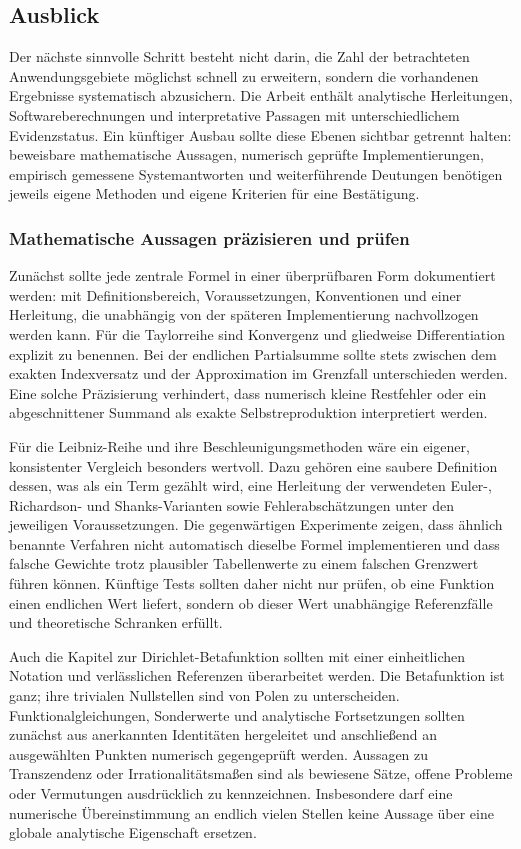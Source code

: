 \documentclass[a4paper,12pt,twoside]{report}
\theoremstyle{definition}
\begin{document}
\subsection{Ausblick}

Der nächste sinnvolle Schritt besteht nicht darin, die Zahl der betrachteten Anwendungsgebiete möglichst schnell zu erweitern, sondern die vorhandenen Ergebnisse systematisch abzusichern. Die Arbeit enthält analytische Herleitungen, Softwareberechnungen und interpretative Passagen mit unterschiedlichem Evidenzstatus. Ein künftiger Ausbau sollte diese Ebenen sichtbar getrennt halten: beweisbare mathematische Aussagen, numerisch geprüfte Implementierungen, empirisch gemessene Systemantworten und weiterführende Deutungen benötigen jeweils eigene Methoden und eigene Kriterien für eine Bestätigung.

\subsubsection{Mathematische Aussagen präzisieren und prüfen}

Zunächst sollte jede zentrale Formel in einer überprüfbaren Form dokumentiert werden: mit Definitionsbereich, Voraussetzungen, Konventionen und einer Herleitung, die unabhängig von der späteren Implementierung nachvollzogen werden kann. Für die Taylorreihe sind Konvergenz und gliedweise Differentiation explizit zu benennen. Bei der endlichen Partialsumme sollte stets zwischen dem exakten Indexversatz und der Approximation im Grenzfall unterschieden werden. Eine solche Präzisierung verhindert, dass numerisch kleine Restfehler oder ein abgeschnittener Summand als exakte Selbstreproduktion interpretiert werden.

Für die Leibniz-Reihe und ihre Beschleunigungsmethoden wäre ein eigener, konsistenter Vergleich besonders wertvoll. Dazu gehören eine saubere Definition dessen, was als ein Term gezählt wird, eine Herleitung der verwendeten Euler-, Richardson- und Shanks-Varianten sowie Fehlerabschätzungen unter den jeweiligen Voraussetzungen. Die gegenwärtigen Experimente zeigen, dass ähnlich benannte Verfahren nicht automatisch dieselbe Formel implementieren und dass falsche Gewichte trotz plausibler Tabellenwerte zu einem falschen Grenzwert führen können. Künftige Tests sollten daher nicht nur prüfen, ob eine Funktion einen endlichen Wert liefert, sondern ob dieser Wert unabhängige Referenzfälle und theoretische Schranken erfüllt.

Auch die Kapitel zur Dirichlet-Betafunktion sollten mit einer einheitlichen Notation und verlässlichen Referenzen überarbeitet werden. Die Betafunktion ist ganz; ihre trivialen Nullstellen sind von Polen zu unterscheiden. Funktionalgleichungen, Sonderwerte und analytische Fortsetzungen sollten zunächst aus anerkannten Identitäten hergeleitet und anschließend an ausgewählten Punkten numerisch gegengeprüft werden. Aussagen zu Transzendenz oder Irrationalitätsmaßen sind als bewiesene Sätze, offene Probleme oder Vermutungen ausdrücklich zu kennzeichnen. Insbesondere darf eine numerische Übereinstimmung an endlich vielen Stellen keine Aussage über eine globale analytische Eigenschaft ersetzen.
\end{document}
